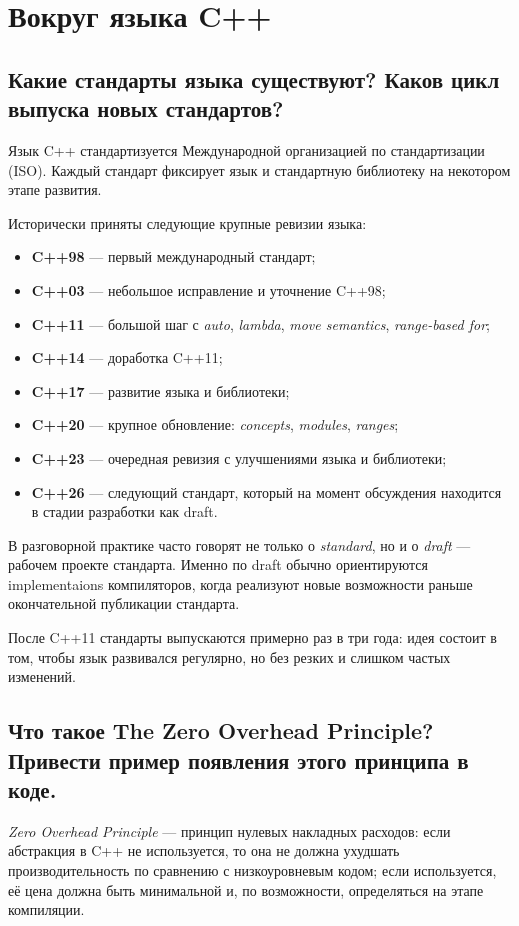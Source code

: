 \section{Вокруг языка C++}

\subsection{Какие стандарты языка существуют? Каков цикл выпуска новых стандартов?}
Язык C++ стандартизуется Международной организацией по стандартизации (ISO). Каждый стандарт фиксирует язык и стандартную библиотеку на некотором этапе развития.

\begin{definition}
Исторически приняты следующие крупные ревизии языка:
\begin{itemize}
    \item \textbf{C++98} — первый международный стандарт;
    \item \textbf{C++03} — небольшое исправление и уточнение C++98;
    \item \textbf{C++11} — большой шаг с \textit{auto}, \textit{lambda}, \textit{move semantics}, \textit{range-based for};
    \item \textbf{C++14} — доработка C++11;
    \item \textbf{C++17} — развитие языка и библиотеки;
    \item \textbf{C++20} — крупное обновление: \textit{concepts}, \textit{modules}, \textit{ranges};
    \item \textbf{C++23} — очередная ревизия с улучшениями языка и библиотеки;
    \item \textbf{C++26} — следующий стандарт, который на момент обсуждения находится в стадии разработки как draft.
\end{itemize}
\end{definition}

\begin{remark}
В разговорной практике часто говорят не только о \textit{standard}, но и о \textit{draft} — рабочем проекте стандарта. Именно по draft обычно ориентируются implementaions компиляторов, когда реализуют новые возможности раньше окончательной публикации стандарта.
\end{remark}

После C++11 стандарты выпускаются примерно раз в три года: идея состоит в том, чтобы язык развивался регулярно, но без резких и слишком частых изменений.

\subsection{Что такое The Zero Overhead Principle? Привести пример появления этого принципа в коде.}
\begin{definition}
\textit{Zero Overhead Principle} — принцип нулевых накладных расходов: если абстракция в C++ не используется, то она не должна ухудшать производительность по сравнению с низкоуровневым кодом; если используется, её цена должна быть минимальной и, по возможности, определяться на этапе компиляции.
\end{definition}


